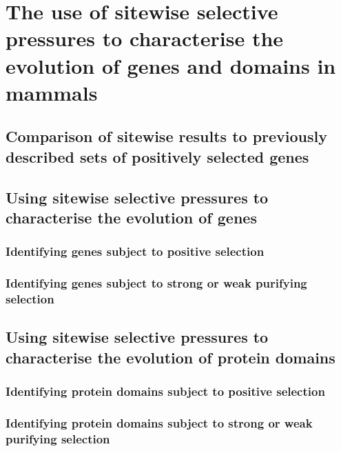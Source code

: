 \chapter{The use of sitewise selective pressures to characterise the evolution of genes and domains in mammals}
\section{Comparison of sitewise results to previously described sets of positively selected genes}
\section{Using sitewise selective pressures to characterise the evolution of genes}
\subsection{Identifying genes subject to positive selection}
\subsection{Identifying genes subject to strong or weak purifying selection}
\section{Using sitewise selective pressures to characterise the evolution of protein domains}
\subsection{Identifying protein domains subject to positive selection}
\subsection{Identifying protein domains subject to strong or weak purifying selection}
